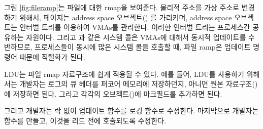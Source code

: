 그림 \ref{fig:fileramp}는 파일에 대한 rmap을 보여준다.
물리적 주소를 가상 주소로 변경하기 위해서, 페이지는
 address space 오브젝트()
를 가리키며, address space 오브젝트는 인터벌 트리를 이용하여 VMAs를 관리한다.
이러한 인터벌 트리는 프로세스간 공유하는 자원이다. 
 그리고 과 같은 시스템 콜은 VMAs에 대해서 동시적 업데이트를 
수반하므로, 프로세스들이 동시에 많은 시스템 콜을 호출할 때, 파일 ramp은 업데이트 명령어 때문에
직렬화가 된다. 

LDU는 파일 rmap 자료구조에 쉽게 적용될 수 있다. 
예를 들어, LDU를 사용하기 위해서는 개발자는 로그의 큐 헤더를 퍼코어 메모리에 저장하던지, 아니면 
원본 자료구조()에 저장하면 된다. 그리고 각각의 오브젝트()에 마크필드를 추가하면 된다. 

그리고 개발자는 락 없이 업데이트 함수를 로깅 함수로 수정한다.  
마지막으로 개발자는   함수를 만들고, 이것을 리드 전에 호출되도록 수정한다.

